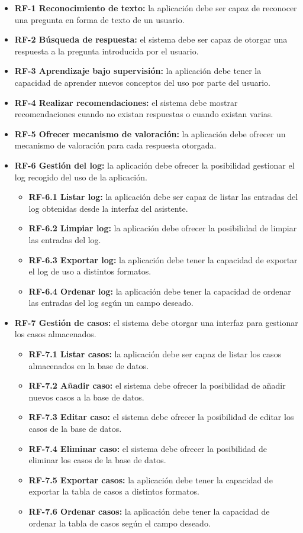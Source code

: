 \begin{itemize}
\tightlist
\item
\textbf{RF-1 Reconocimiento de texto:} la aplicación debe ser capaz de reconocer una pregunta en forma de texto de un usuario.
\item
\textbf{RF-2 Búsqueda de respuesta:} el sistema debe ser capaz de otorgar una respuesta a la pregunta introducida por el usuario.
\item
\textbf{RF-3 Aprendizaje bajo supervisión:} la aplicación debe tener la capacidad de aprender nuevos conceptos del uso por parte del usuario.
\item
\textbf{RF-4 Realizar recomendaciones:} el sistema debe mostrar recomendaciones cuando no existan respuestas o cuando existan varias.
\item
\textbf{RF-5 Ofrecer mecanismo de valoración:} la aplicación debe ofrecer un mecanismo de valoración para cada respuesta otorgada.
\item
\textbf{RF-6 Gestión del log:} la aplicación debe ofrecer la posibilidad gestionar el log recogido del uso de la aplicación.
	\begin{itemize}
	\tightlist
	\item
	\textbf{RF-6.1 Listar log:} la aplicación debe ser capaz de listar las entradas del log obtenidas desde la interfaz del asistente.
	\item
	\textbf{RF-6.2 Limpiar log:} la aplicación debe ofrecer la posibilidad de limpiar las entradas del log.	
	\item
	\textbf{RF-6.3 Exportar log:} la aplicación debe tener la capacidad de exportar el log de uso a distintos formatos.
	\item
	\textbf{RF-6.4 Ordenar log:} la aplicación debe tener la capacidad de ordenar las entradas del log según un campo deseado.
	\end{itemize}
\item
\textbf{RF-7 Gestión de casos:} el sistema debe otorgar una interfaz para gestionar los casos almacenados.
	\begin{itemize}
	\tightlist
	\item
	\textbf{RF-7.1 Listar casos:} la aplicación debe ser capaz de listar los casos almacenados en la base de datos.
	\item
	\textbf{RF-7.2 Añadir caso:} el sistema debe ofrecer la posibilidad de añadir nuevos casos a la base de datos.
	\item
	\textbf{RF-7.3 Editar caso:} el sistema debe ofrecer la posibilidad de editar los casos de la base de datos.
	\item
	\textbf{RF-7.4 Eliminar caso:} el sistema debe ofrecer la posibilidad de eliminar los casos de la base de datos.
	\item
	\textbf{RF-7.5 Exportar casos:} la aplicación debe tener la capacidad de exportar la tabla de casos a distintos formatos.
	\item
	\textbf{RF-7.6 Ordenar casos:} la aplicación debe tener la capacidad de ordenar la tabla de casos según el campo deseado.
	\end{itemize}


\end{itemize}
